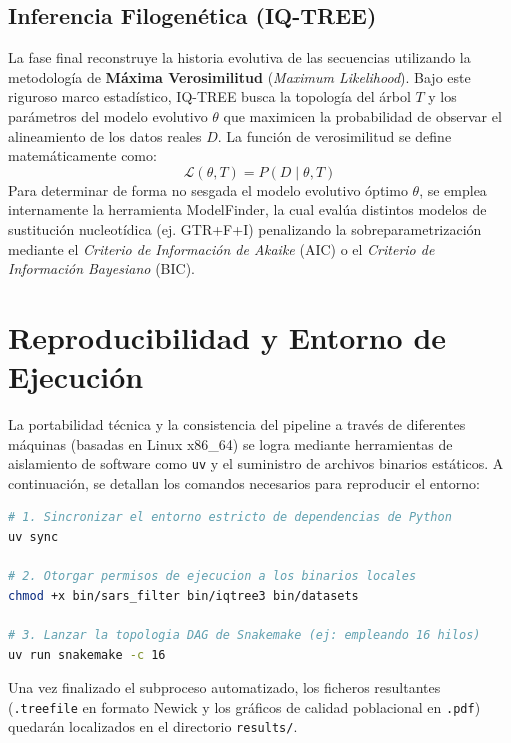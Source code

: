 \documentclass[11pt,a4paper]{article}
\begin{document}
\subsection{Inferencia Filogenética (IQ-TREE)}
La fase final reconstruye la historia evolutiva de las secuencias utilizando la metodología de \textbf{Máxima Verosimilitud} (\textit{Maximum Likelihood}). Bajo este riguroso marco estadístico, IQ-TREE busca la topología del árbol $T$ y los parámetros del modelo evolutivo $\theta$ que maximicen la probabilidad de observar el alineamiento de los datos reales $D$. La función de verosimilitud se define matemáticamente como:
\begin{equation}
    \mathcal{L}(\theta, T) = P(D \mid \theta, T)
\end{equation}
Para determinar de forma no sesgada el modelo evolutivo óptimo $\theta$, se emplea internamente la herramienta ModelFinder, la cual evalúa distintos modelos de sustitución nucleotídica (ej. GTR+F+I) penalizando la sobreparametrización mediante el \textit{Criterio de Información de Akaike} (AIC) o el \textit{Criterio de Información Bayesiano} (BIC).

\section{Reproducibilidad y Entorno de Ejecución}
La portabilidad técnica y la consistencia del pipeline a través de diferentes máquinas (basadas en Linux x86\_64) se logra mediante herramientas de aislamiento de software como \texttt{uv} y el suministro de archivos binarios estáticos. A continuación, se detallan los comandos necesarios para reproducir el entorno:

\begin{lstlisting}[language=bash, caption={Instrucciones de orquestación y arranque del pipeline}]
# 1. Sincronizar el entorno estricto de dependencias de Python
uv sync

# 2. Otorgar permisos de ejecucion a los binarios locales
chmod +x bin/sars_filter bin/iqtree3 bin/datasets

# 3. Lanzar la topologia DAG de Snakemake (ej: empleando 16 hilos)
uv run snakemake -c 16
\end{lstlisting}

Una vez finalizado el subproceso automatizado, los ficheros resultantes (\texttt{.treefile} en formato Newick y los gráficos de calidad poblacional en \texttt{.pdf}) quedarán localizados en el directorio \texttt{results/}.
\end{document}
